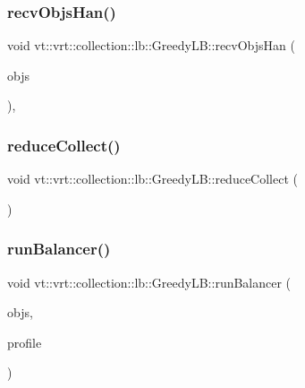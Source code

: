 \subsubsection{\texorpdfstring{recv\+Objs\+Han()}{recvObjsHan()}}
{\footnotesize\ttfamily void vt\+::vrt\+::collection\+::lb\+::\+Greedy\+L\+B\+::recv\+Objs\+Han (\begin{DoxyParamCaption}\item[{\hyperlink{structvt_1_1vrt_1_1collection_1_1lb_1_1_greedy_l_b_types_ae22670acd689e4ff83315fac2e4acb5e}{Greedy\+L\+B\+Types\+::\+Obj\+I\+D\+Type} $\ast$}]{objs }\end{DoxyParamCaption})\hspace{0.3cm}{\ttfamily [static]}, {\ttfamily [private]}}

\mbox{\label{structvt_1_1vrt_1_1collection_1_1lb_1_1_greedy_l_b_afbb460b759e33f8f6e703858d4457cad}} 
\subsubsection{\texorpdfstring{reduce\+Collect()}{reduceCollect()}}
{\footnotesize\ttfamily void vt\+::vrt\+::collection\+::lb\+::\+Greedy\+L\+B\+::reduce\+Collect (\begin{DoxyParamCaption}{ }\end{DoxyParamCaption})\hspace{0.3cm}{\ttfamily [private]}}

\mbox{\label{structvt_1_1vrt_1_1collection_1_1lb_1_1_greedy_l_b_a1d99110d1226a5f843aab375e2949b7a}} 
\subsubsection{\texorpdfstring{run\+Balancer()}{runBalancer()}}
{\footnotesize\ttfamily void vt\+::vrt\+::collection\+::lb\+::\+Greedy\+L\+B\+::run\+Balancer (\begin{DoxyParamCaption}\item[{\hyperlink{structvt_1_1vrt_1_1collection_1_1lb_1_1_base_l_b_a331d7da5bbf2883238427d86b54ddd7b}{Obj\+Sample\+Type} \&\&}]{objs,  }\item[{\hyperlink{structvt_1_1vrt_1_1collection_1_1lb_1_1_greedy_l_b_a3db2c9b36ac99ed4aed38519be4aad60}{Load\+Profile\+Type} \&\&}]{profile }\end{DoxyParamCaption})\hspace{0.3cm}{\ttfamily [private]}}

